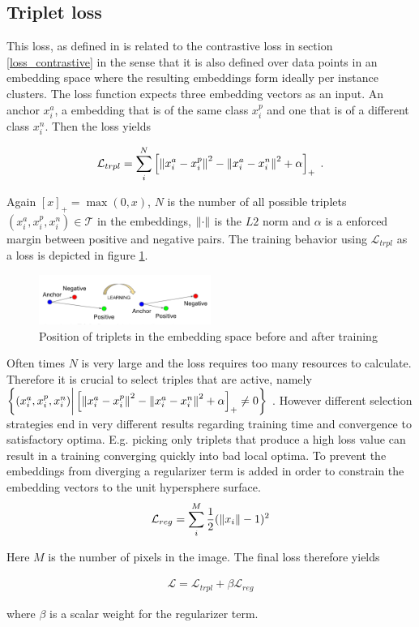 \subsection{Triplet loss}\label{loss_triplet}
This loss, as defined in \cite{Schroff_2015} is related to the contrastive loss in section \ref{loss_contrastive} in the sense that it is also defined over data points in an embedding space where the resulting embeddings form ideally per instance clusters. The loss function expects three embedding vectors as an input. An anchor $x_i^a$, a embedding that is of the same class $x_i^p$ and one that is of a different class $x_i^n$. Then the loss yields

\begin{align}
	\mathcal{L}_{trpl} = \sum_i^N \left[ \left\lVert x_i^a - x_i^p\right\rVert^2 - \left\lVert x_i^a - x_i^n\right\rVert^2 + \alpha \right]_+ \text{\hspace{1mm}.}
\end{align} 

Again $[x]_+ = \max(0, x)$, $N$ is the number of all possible triplets $(x_i^a, x_i^p, x_i^n) \in \mathcal{T}$ in the embeddings, $\left\lVert\cdot\right\rVert$ is the $L2$ norm and $\alpha$ is a enforced margin between positive and negative pairs. The training behavior using $\mathcal{L}_{trpl}$ as a loss is depicted in figure \ref{fig_triplet}. \\

\begin{figure}[ht!]
	\centering
	\includegraphics[width=0.5\textwidth]{figures/triplet_loss.png}
	\caption{Position of triplets in the embedding space before and after training \cite{Schroff_2015}}
	\label{fig_triplet}
\end{figure}

Often times $N$ is very large and the loss requires too many resources to calculate. Therefore it is crucial to select triples that are active, namely $\left\{ (x_i^a, x_i^p, x_i^n) \bigg| \left[ \left\lVert x_i^a - x_i^p\right\rVert^2 - \left\lVert x_i^a - x_i^n\right\rVert^2 + \alpha \right]_+ \neq 0 \right\}$ . However different selection strategies end in very different results regarding training time and convergence to satisfactory optima. E.g. picking only triplets that produce a high loss value can result in a training converging quickly into bad local optima.
To prevent the embeddings from diverging a regularizer term is added in order to constrain the embedding vectors to the unit hypersphere surface.
\begin{align}
	\mathcal{L}_{reg} = \sum_i^M\frac{1}{2}(\left\lVert x_i\right\rVert - 1)^2
\end{align}

Here $M$ is the number of pixels in the image. The final loss therefore yields

\begin{align}
\mathcal{L} = \mathcal{L}_{trpl} + \beta \mathcal{L}_{reg}
\end{align}

where $\beta$ is a scalar weight for the regularizer term.